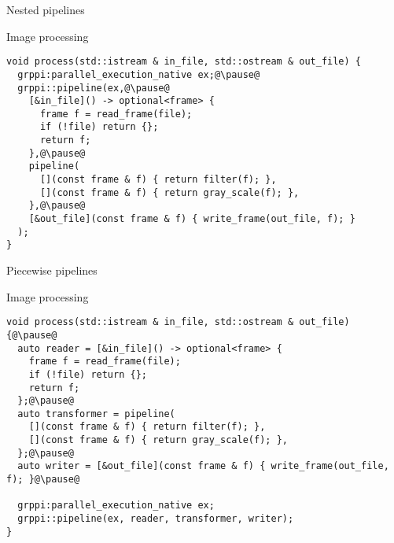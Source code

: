 \begin{frame}[t,fragile]{Nested pipelines}
\begin{block}{Image processing}
\begin{lstlisting}[escapechar=@]
void process(std::istream & in_file, std::ostream & out_file) {
  grppi:parallel_execution_native ex;@\pause@
  grppi::pipeline(ex,@\pause@
    [&in_file]() -> optional<frame> {
      frame f = read_frame(file);
      if (!file) return {};
      return f;
    },@\pause@
    pipeline(
      [](const frame & f) { return filter(f); },
      [](const frame & f) { return gray_scale(f); },
    },@\pause@
    [&out_file](const frame & f) { write_frame(out_file, f); }
  );
}
\end{lstlisting}
\end{block}
\end{frame}

\begin{frame}[t,fragile]{Piecewise pipelines}
\begin{block}{Image processing}
\begin{lstlisting}[escapechar=@]
void process(std::istream & in_file, std::ostream & out_file) {@\pause@
  auto reader = [&in_file]() -> optional<frame> {
    frame f = read_frame(file);
    if (!file) return {};
    return f;
  };@\pause@
  auto transformer = pipeline(
    [](const frame & f) { return filter(f); },
    [](const frame & f) { return gray_scale(f); },
  };@\pause@
  auto writer = [&out_file](const frame & f) { write_frame(out_file, f); }@\pause@

  grppi:parallel_execution_native ex;
  grppi::pipeline(ex, reader, transformer, writer);
}
\end{lstlisting}
\end{block}
\end{frame}
